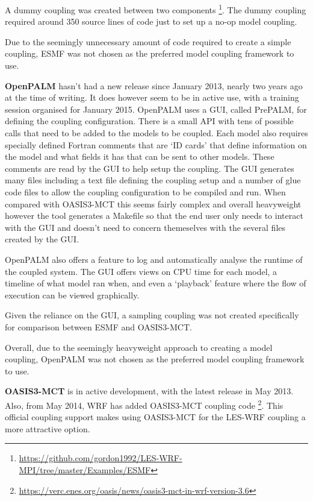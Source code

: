 \documentclass{acm_proc_article-sp}
\renewcommand{\_}{\underscore\hspace{0pt}}
\begin{document}
A dummy coupling was created between two components
\footnote{\url{https://github.com/gordon1992/LES-WRF-MPI/tree/master/Examples/ESMF}}.
The dummy coupling required around 350 source lines of code just to set up a
no-op model coupling.

Due to the seemingly unnecessary amount of code required to create a simple
coupling, ESMF was not chosen as the preferred model coupling framework to use.

\textbf{OpenPALM} hasn't had a new release since January 2013, nearly two years
ago at the time of writing. It does however seem to be in active use, with a
training session organised for January 2015. OpenPALM uses a GUI, called
PrePALM, for defining the coupling configuration. There is a small API with tens
of possible calls that need to be added to the models to be coupled. Each model
also requires specially defined Fortran comments that are `ID cards' that define
information on the model and what fields it has that can be sent to other
models. These comments are read by the GUI to help setup the coupling. The GUI
generates many files including a text file defining the coupling setup and a
number of glue code files to allow the coupling configuration to be compiled and
run. When compared with OASIS3-MCT this seems fairly complex and overall
heavyweight however the tool generates a Makefile so that the end user only
needs to interact with the GUI and doesn't need to concern themeselves with the
several files created by the GUI.

OpenPALM also offers a feature to log and automatically analyse the runtime of
the coupled system. The GUI offers views on CPU time for each model, a timeline
of what model ran when, and even a `playback' feature where the flow of
execution can be viewed graphically.

Given the reliance on the GUI, a sampling coupling was not created specifically
for comparison between ESMF and OASIS3-MCT.

Overall, due to the seemingly heavyweight approach to creating a model coupling,
OpenPALM was not chosen as the preferred model coupling framework to use.

\textbf{OASIS3-MCT} is in active development, with the latest release in May
2013. Also, from May 2014, WRF has added OASIS3-MCT coupling code
\footnote{\url{https://verc.enes.org/oasis/news/oasis3-mct-in-wrf-version-3.6}}.
This official coupling support makes using OASIS3-MCT for the LES-WRF coupling a
more attractive option.
\end{document}
